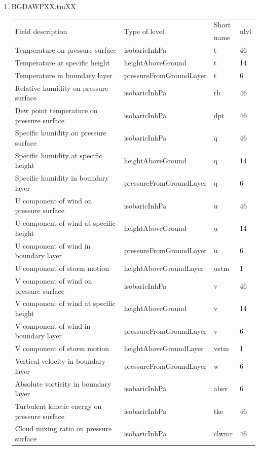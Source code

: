 \documentclass[11pt,fleqn]{report}              %
\begin{document}
\begin{enumerate}
\begin{enumerate}
\begin{itemize}
\begin{enumerate}
\item BGDAWPXX.tmXX
{
\fontsize{10}{12}\selectfont
\begin{longtable}{ p{0.54\linewidth} | p{0.31\linewidth} | p{0.09\linewidth} | p{0.06\linewidth} }
\hline
\hline
 \multirow{2}{*}{Field description} & \multirow{2}{*}{Type of level} & Short &  \multirow{2}{*}{nlvl}  \\
  & & name &  \\
\hline
 Temperature on pressure surface & isobaricInhPa & t & 46 \\
 Temperature at specific height & heightAboveGround & t & 14 \\
 Temperature in boundary layer & pressureFromGroundLayer & t & 6 \\
 Relative humidity on pressure surface & isobaricInhPa & rh & 46  \\
 Dew point temperature on pressure surface & isobaricInhPa & dpt & 46 \\
 Specific humidity on pressure surface & isobaricInhPa & q & 46  \\
 Specific humidity at specific height & heightAboveGround & q & 14  \\
 Specific humidity in boundary layer & pressureFromGroundLayer & q & 6  \\
 U component of wind on pressure surface & isobaricInhPa & u & 46 \\
 U component of wind at specific height & heightAboveGround & u & 14 \\
 U component of wind in boundary layer & pressureFromGroundLayer & u & 6 \\
 U component of storm motion & heightAboveGroundLayer & ustm & 1  \\
 V component of wind on pressure surface & isobaricInhPa & v & 46 \\
 V component of wind at specific height & heightAboveGround & v & 14 \\
 V component of wind in boundary layer & pressureFromGroundLayer & v & 6 \\
 V component of storm motion & heightAboveGroundLayer & vstm & 1  \\
 Vertical velocity in boundary layer & pressureFromGroundLayer & w & 6 \\
 Absolute vorticity in boundary layer & isobaricInhPa & absv & 6 \\
 Turbulent kinetic energy on pressure surface & isobaricInhPa & tke & 46 \\
 Cloud mixing ratio on pressure surface & isobaricInhPa & clwmr & 46 \\

\end{longtable}}
\end{enumerate}
\end{itemize}
\end{enumerate}
\end{enumerate}
\end{document}

